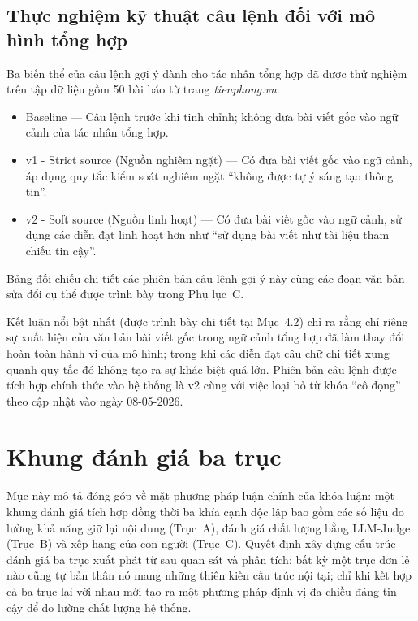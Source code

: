 \subsection{Thực nghiệm kỹ thuật câu lệnh đối với mô hình tổng hợp}

Ba biến thể của câu lệnh gợi ý dành cho tác nhân tổng hợp đã được thử nghiệm trên tập dữ liệu gồm 50 bài báo từ trang \textit{tienphong.vn}:

\begin{itemize}
  \item Baseline --- Câu lệnh trước khi tinh chỉnh; không đưa bài viết gốc vào ngữ cảnh của tác nhân tổng hợp.
  \item v1 - Strict source (Nguồn nghiêm ngặt) --- Có đưa bài viết gốc vào ngữ cảnh, áp dụng quy tắc kiểm soát nghiêm ngặt ``không được tự ý sáng tạo thông tin''.
  \item v2 - Soft source (Nguồn linh hoạt) --- Có đưa bài viết gốc vào ngữ cảnh, sử dụng các diễn đạt linh hoạt hơn như ``sử dụng bài viết như tài liệu tham chiếu tin cậy''.
\end{itemize}

Bảng đối chiếu chi tiết các phiên bản câu lệnh gợi ý này cùng các đoạn văn bản sửa đổi cụ thể được trình bày trong Phụ lục~C.

Kết luận nổi bật nhất (được trình bày chi tiết tại Mục~4.2) chỉ ra rằng chỉ riêng sự xuất hiện của văn bản bài viết gốc trong ngữ cảnh tổng hợp đã làm thay đổi hoàn toàn hành vi của mô hình; 
trong khi các diễn đạt câu chữ chi tiết xung quanh quy tắc đó không tạo ra sự khác biệt quá lớn. 
Phiên bản câu lệnh được tích hợp chính thức vào hệ thống là v2 cùng với việc loại bỏ từ khóa ``cô đọng'' theo cập nhật vào ngày 08-05-2026.

\section{Khung đánh giá ba trục}

Mục này mô tả đóng góp về mặt phương pháp luận chính của khóa luận: một khung đánh giá tích hợp đồng thời ba khía cạnh độc lập bao gồm các số liệu đo lường khả năng giữ lại nội dung (Trục~A), đánh giá chất lượng bằng LLM-Judge (Trục~B) và xếp hạng của con người (Trục~C). 
Quyết định xây dựng cấu trúc đánh giá ba trục xuất phát từ sau quan sát và phân tích: bất kỳ một trục đơn lẻ nào cũng tự bản thân nó mang những thiên kiến cấu trúc nội tại; chỉ khi kết hợp cả ba trục lại với nhau mới tạo ra một phương pháp định vị đa chiều đáng tin cậy để đo lường chất lượng hệ thống.

